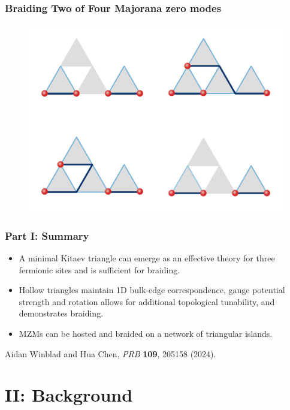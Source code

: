 \documentclass[xcolor=dvipsnames,10pt,aspectratio=169]{beamer}
\newcommand{\BD}{Background}
\newcommand{\CO}{Summary}
\begin{document}
  \begin{frame}
    \frametitle{Braiding Two of Four Majorana zero modes}
    \vspace{-2mm}
    \begin{figure}
      \includegraphics[height=0.9\textheight]{./figures/4-mf-swap-2-3.pdf}
    \end{figure}
  \end{frame}

  \begin{frame}
    \frametitle{Part I: Summary}

    \begin{itemize}
      \item A minimal Kitaev triangle can emerge as an effective theory for three fermionic sites and is sufficient for braiding.
      \item Hollow triangles maintain 1D bulk-edge correspondence, gauge potential strength and rotation allows for additional topological tunability, and demonstrates braiding.
      \item MZMs can be hosted and braided on a network of triangular islands.
    \end{itemize}
    \vspace{2em}
    \centering
    \small
    Aidan Winblad and Hua Chen, \textit{PRB} \textbf{109}, 205158 (2024).
  \end{frame}

  \section{II: \BD }
\end{document}
